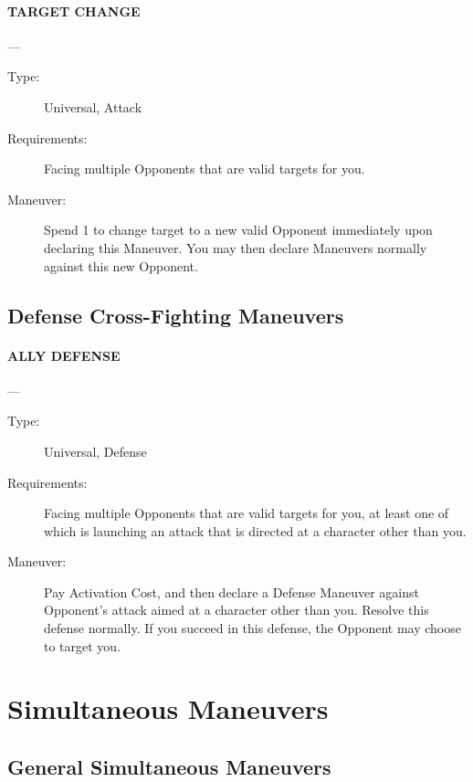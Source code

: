 \documentclass[oneside,11pt,english]{book}
\begin{document}
\paragraph{\large\label{man:TARGET CHANGE} TARGET CHANGE}---\quad{\large[1]}
\vspace{-10pt}\begin{description} 
\item [Type:] Universal, Attack 
\item [Requirements:] Facing multiple Opponents that are valid targets for you. 
\item [Maneuver:] Spend 1 to change target to a new valid Opponent immediately upon declaring this 
Maneuver. You may then declare Maneuvers normally against this new Opponent. 
\end{description}
\subsection{Defense Cross-Fighting Maneuvers}
\paragraph{\large\label{man:ALLY DEFENSE} ALLY DEFENSE}---\quad{\large[2]}
\vspace{-10pt}\begin{description} 
\item [Type:] Universal, Defense 
\item [Requirements:] Facing multiple Opponents that are valid targets for you, at least one of which is 
launching an attack that is directed at a character other than you. 
\item [Maneuver:] Pay Activation Cost, and then declare a Defense Maneuver against Opponent’s attack aimed 
at a character other than you. Resolve this defense normally. If you succeed in this defense, the Opponent 
may choose to target you. 
\end{description}

\section{Simultaneous Maneuvers}
\subsection{General Simultaneous Maneuvers}
\end{document}
